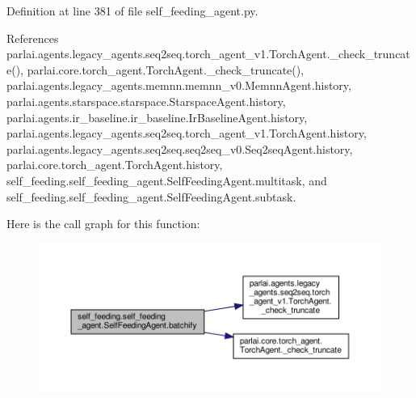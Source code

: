 Definition at line 381 of file self\+\_\+feeding\+\_\+agent.\+py.



References parlai.\+agents.\+legacy\+\_\+agents.\+seq2seq.\+torch\+\_\+agent\+\_\+v1.\+Torch\+Agent.\+\_\+check\+\_\+truncate(), parlai.\+core.\+torch\+\_\+agent.\+Torch\+Agent.\+\_\+check\+\_\+truncate(), parlai.\+agents.\+legacy\+\_\+agents.\+memnn.\+memnn\+\_\+v0.\+Memnn\+Agent.\+history, parlai.\+agents.\+starspace.\+starspace.\+Starspace\+Agent.\+history, parlai.\+agents.\+ir\+\_\+baseline.\+ir\+\_\+baseline.\+Ir\+Baseline\+Agent.\+history, parlai.\+agents.\+legacy\+\_\+agents.\+seq2seq.\+torch\+\_\+agent\+\_\+v1.\+Torch\+Agent.\+history, parlai.\+agents.\+legacy\+\_\+agents.\+seq2seq.\+seq2seq\+\_\+v0.\+Seq2seq\+Agent.\+history, parlai.\+core.\+torch\+\_\+agent.\+Torch\+Agent.\+history, self\+\_\+feeding.\+self\+\_\+feeding\+\_\+agent.\+Self\+Feeding\+Agent.\+multitask, and self\+\_\+feeding.\+self\+\_\+feeding\+\_\+agent.\+Self\+Feeding\+Agent.\+subtask.

Here is the call graph for this function\+:
\nopagebreak
\begin{figure}[H]
\begin{center}
\leavevmode
\includegraphics[width=350pt]{classself__feeding_1_1self__feeding__agent_1_1SelfFeedingAgent_a46f3cf20e84609fb9431031adaf4c721_cgraph}
\end{center}
\end{figure}
\mbox{\label{classself__feeding_1_1self__feeding__agent_1_1SelfFeedingAgent_ae8934c79f3d7079b09dadb1fc78d59b5}} 
